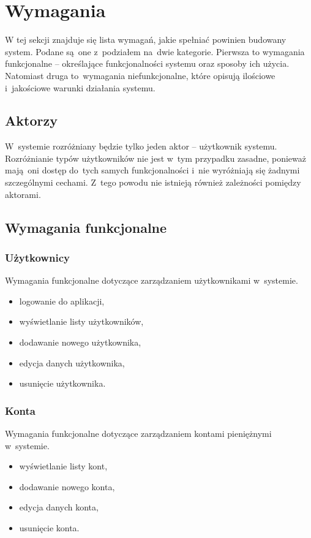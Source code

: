 \section{Wymagania}
W tej sekcji znajduje się lista wymagań, jakie spełniać powinien budowany system. Podane są~one z~podziałem na~dwie kategorie. Pierwsza to wymagania funkcjonalne -- określające funkcjonalności systemu oraz sposoby ich użycia. Natomiast druga to~wymagania niefunkcjonalne, które opisują ilościowe i~jakościowe warunki działania systemu.

\subsection{Aktorzy}
W~systemie rozróżniany będzie tylko jeden aktor -- użytkownik systemu. Rozróżnianie typów użytkowników nie jest w~tym przypadku zasadne, ponieważ mają oni dostęp do~tych samych funkcjonalności i~nie wyróżniają się żadnymi szczególnymi cechami. Z~tego powodu nie istnieją również zależności pomiędzy aktorami.

\subsection{Wymagania funkcjonalne}
\subsubsection{Użytkownicy}
Wymagania funkcjonalne dotyczące zarządzaniem użytkownikami w~systemie.
\begin{itemize}
  \item logowanie do aplikacji,
  \item wyświetlanie listy użytkowników,
  \item dodawanie nowego użytkownika,
  \item edycja danych użytkownika,
  \item usunięcie użytkownika.
\end{itemize}

\subsubsection{Konta}
Wymagania funkcjonalne dotyczące zarządzaniem kontami pieniężnymi w~systemie.
\begin{itemize}
  \item wyświetlanie listy kont,
  \item dodawanie nowego konta,
  \item edycja danych konta,
  \item usunięcie konta.
\end{itemize}

